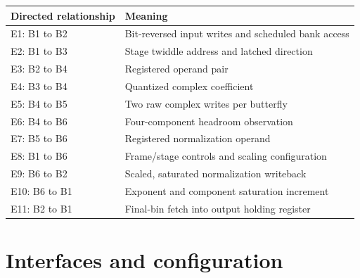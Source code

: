 \documentclass[11pt,a4paper]{article}
\begin{document}
{\small\renewcommand{\arraystretch}{1.18}\begin{longtable}{@{}L{0.24\textwidth}L{0.7\textwidth}@{}}\toprule

\textbf{Directed relationship} & \textbf{Meaning}\\\midrule\endhead

E1: B1 to B2 & Bit-reversed input writes and scheduled bank access\\[3pt]

E2: B1 to B3 & Stage twiddle address and latched direction\\[3pt]

E3: B2 to B4 & Registered operand pair\\[3pt]

E4: B3 to B4 & Quantized complex coefficient\\[3pt]

E5: B4 to B5 & Two raw complex writes per butterfly\\[3pt]

E6: B4 to B6 & Four-component headroom observation\\[3pt]

E7: B5 to B6 & Registered normalization operand\\[3pt]

E8: B1 to B6 & Frame/\allowbreak{}stage controls and scaling configuration\\[3pt]

E9: B6 to B2 & Scaled,\allowbreak{} saturated normalization writeback\\[3pt]

E10: B6 to B1 & Exponent and component saturation increment\\[3pt]

E11: B2 to B1 & Final-bin fetch into output holding register\\[3pt]

\bottomrule\end{longtable}}

\section{Interfaces and configuration}
\end{document}
